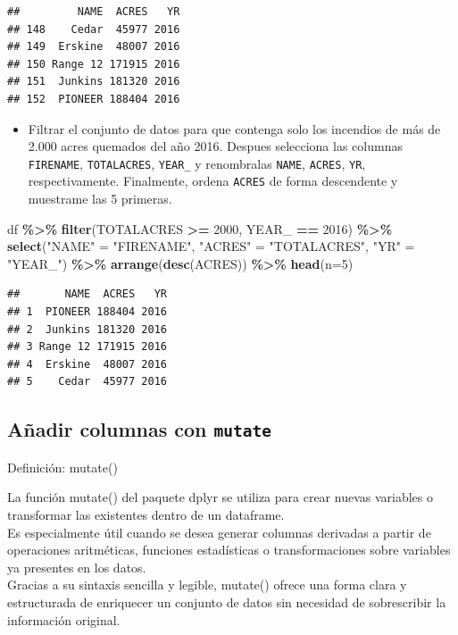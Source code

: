 \documentclass[
]{book}
\newenvironment{Shaded}{\begin{snugshade}}{\end{snugshade}}
\newcommand{\AttributeTok}[1]{\textcolor[rgb]{0.13,0.29,0.53}{#1}}
\newcommand{\DecValTok}[1]{\textcolor[rgb]{0.00,0.00,0.81}{#1}}
\newcommand{\FunctionTok}[1]{\textcolor[rgb]{0.13,0.29,0.53}{\textbf{#1}}}
\newcommand{\NormalTok}[1]{#1}
\newcommand{\OtherTok}[1]{\textcolor[rgb]{0.56,0.35,0.01}{#1}}
\newcommand{\SpecialCharTok}[1]{\textcolor[rgb]{0.81,0.36,0.00}{\textbf{#1}}}
\newcommand{\StringTok}[1]{\textcolor[rgb]{0.31,0.60,0.02}{#1}}
\providecommand{\tightlist}{%
  \setlength{\itemsep}{0pt}\setlength{\parskip}{0pt}}
\begin{document}
\begin{verbatim}
##         NAME  ACRES   YR
## 148    Cedar  45977 2016
## 149  Erskine  48007 2016
## 150 Range 12 171915 2016
## 151  Junkins 181320 2016
## 152  PIONEER 188404 2016
\end{verbatim}

\begin{itemize}
\tightlist
\item
  Filtrar el conjunto de datos para que contenga solo los incendios de más de 2.000 acres quemados del año 2016. Despues selecciona las columnas \texttt{FIRENAME}, \texttt{TOTALACRES}, \texttt{YEAR\_} y renombralas \texttt{NAME}, \texttt{ACRES}, \texttt{YR}, respectivamente. Finalmente, ordena \texttt{ACRES} de forma descendente y muestrame las 5 primeras.
\end{itemize}

\begin{Shaded}
\begin{Highlighting}[]
\NormalTok{df }\SpecialCharTok{\%\textgreater{}\%} 
  \FunctionTok{filter}\NormalTok{(TOTALACRES }\SpecialCharTok{\textgreater{}=} \DecValTok{2000}\NormalTok{, YEAR\_ }\SpecialCharTok{==} \DecValTok{2016}\NormalTok{) }\SpecialCharTok{\%\textgreater{}\%} 
  \FunctionTok{select}\NormalTok{(}\StringTok{"NAME"} \OtherTok{=} \StringTok{"FIRENAME"}\NormalTok{, }\StringTok{"ACRES"} \OtherTok{=} \StringTok{"TOTALACRES"}\NormalTok{, }\StringTok{"YR"} \OtherTok{=} \StringTok{"YEAR\_"}\NormalTok{) }\SpecialCharTok{\%\textgreater{}\%}   \FunctionTok{arrange}\NormalTok{(}\FunctionTok{desc}\NormalTok{(ACRES)) }\SpecialCharTok{\%\textgreater{}\%} 
  \FunctionTok{head}\NormalTok{(}\AttributeTok{n=}\DecValTok{5}\NormalTok{)}
\end{Highlighting}
\end{Shaded}

\begin{verbatim}
##       NAME  ACRES   YR
## 1  PIONEER 188404 2016
## 2  Junkins 181320 2016
## 3 Range 12 171915 2016
## 4  Erskine  48007 2016
## 5    Cedar  45977 2016
\end{verbatim}

\subsection{\texorpdfstring{Añadir columnas con \texttt{mutate}}{Añadir columnas con mutate}}\label{auxf1adir-columnas-con-mutate}

{} Definición: mutate()

La función mutate() del paquete dplyr se utiliza para
crear nuevas variables o transformar las existentes dentro de un dataframe.\\
Es especialmente útil cuando se desea generar columnas derivadas a partir de operaciones aritméticas,
funciones estadísticas o transformaciones sobre variables ya presentes en los datos.\\
Gracias a su sintaxis sencilla y legible, mutate() ofrece una forma clara y estructurada
de enriquecer un conjunto de datos sin necesidad de sobrescribir la información original.
\end{document}
